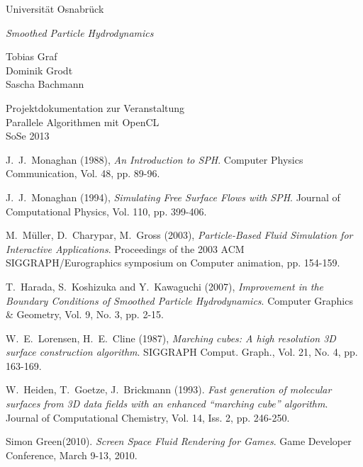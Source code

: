 \documentclass[a4paper,12pt,oneside]{amsbook}
\begin{document}
\begin{titlepage}
\begin{center}
{\large Universität Osnabrück}


\vspace{9em}
{\LARGE \emph{Smoothed Particle Hydrodynamics}}

\vspace{2em}
{\large Tobias Graf\\ Dominik Grodt\\ Sascha Bachmann}

\vspace{9em}
{\large Projektdokumentation zur Veranstaltung\\ Parallele Algorithmen mit OpenCL\\ SoSe 2013}



\end{center}
\end{titlepage}

\tableofcontents










\begin{thebibliography}{}


J.\ J.\ Monaghan (1988),
{\em An Introduction to SPH}. Computer Physics Communication, Vol. 48, pp. 89-96.


J.\ J.\ Monaghan (1994),
{\em Simulating Free Surface Flows with SPH}. Journal of Computational Physics, Vol. 110, pp. 399-406.


M.\ Müller, D.\ Charypar, M.\ Gross (2003),
{\em Particle-Based Fluid Simulation for Interactive Applications}. Proceedings of the 2003 ACM SIGGRAPH/Eurographics symposium on Computer animation, pp. 154-159.


T.\ Harada, S.\ Koshizuka and Y.\ Kawaguchi (2007),
{\em Improvement in the Boundary Conditions of Smoothed Particle Hydrodynamics}. Computer Graphics \& Geometry, Vol. 9, No. 3, pp. 2-15.


W.\ E.\ Lorensen, H.\ E.\ Cline (1987),
{\em Marching cubes: A high resolution 3D surface construction algorithm}. SIGGRAPH Comput. Graph., Vol. 21, No. 4, pp. 163-169.


W.\ Heiden, T.\ Goetze, J.\ Brickmann (1993). {\em Fast generation of molecular surfaces from 3D data fields with an enhanced ``marching cube'' algorithm}. Journal of Computational Chemistry, Vol. 14, Iss. 2, pp. 246-250.

Simon Green(2010). {\em Screen Space Fluid Rendering for Games}. Game Developer Conference, March 9-13, 2010.

\end{thebibliography}
\end{document}
